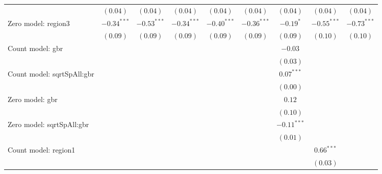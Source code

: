 \begin{sidewaystable}
\begin{center}
{\begin{tabular}{l c c c c c c c c}
                               & $(0.04)$       & $(0.04)$      & $(0.04)$      & $(0.04)$      & $(0.04)$      & $(0.04)$      & $(0.04)$      & $(0.04)$      \\
Zero model: region3            & $-0.34^{***}$  & $-0.53^{***}$ & $-0.34^{***}$ & $-0.40^{***}$ & $-0.36^{***}$ & $-0.19^{*}$   & $-0.55^{***}$ & $-0.73^{***}$ \\
                               & $(0.09)$       & $(0.09)$      & $(0.09)$      & $(0.09)$      & $(0.09)$      & $(0.09)$      & $(0.10)$      & $(0.10)$      \\
Count model: gbr               &                &               &               &               &               & $-0.03$       &               &               \\
                               &                &               &               &               &               & $(0.03)$      &               &               \\
Count model: sqrtSpAll:gbr     &                &               &               &               &               & $0.07^{***}$  &               &               \\
                               &                &               &               &               &               & $(0.00)$      &               &               \\
Zero model: gbr                &                &               &               &               &               & $0.12$        &               &               \\
                               &                &               &               &               &               & $(0.10)$      &               &               \\
Zero model: sqrtSpAll:gbr      &                &               &               &               &               & $-0.11^{***}$ &               &               \\
                               &                &               &               &               &               & $(0.01)$      &               &               \\
Count model: region1           &                &               &               &               &               &               & $0.66^{***}$  &               \\
                               &                &               &               &               &               &               & $(0.03)$      &               \\

\end{tabular}}
\end{center}
\end{sidewaystable}

